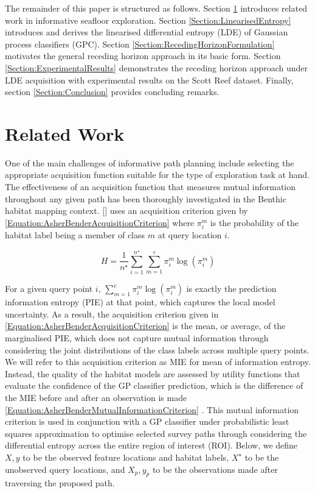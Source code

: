 \documentclass{article}
\newcommand{\incite}[1]{\citeauthor{#1} [\citeyear{#1}]}
\begin{document}
	The remainder of this paper is structured as follows. Section \ref{Section:RelatedWork} introduces related work in informative seafloor exploration. Section \ref{Section:LinearisedEntropy} introduces and derives the linearised differential entropy (LDE) of Gaussian process classifiers (GPC). Section \ref{Section:RecedingHorizonFormulation} motivates the general receding horizon approach in its basic form. Section \ref{Section:ExperimentalResults} demonstrates the receding horizon approach under LDE acquisition with experimental results on the Scott Reef dataset. Finally, section \ref{Section:Conclusion} provides concluding remarks.
	
\section{Related Work}
\label{Section:RelatedWork}

	One of the main challenges of informative path planning include selecting the appropriate acquisition function suitable for the type of exploration task at hand. The effectiveness of an acquisition function that measures mutual information throughout any given path has been thoroughly investigated in the Benthic habitat mapping context. \incite{AsherBender} uses an acquisition criterion given by \eqref{Equation:AsherBenderAcquisitionCriterion} where $\pi^{m}_{i}$ is the probability of the habitat label being a member of class $m$ at query location $i$. 
	
	\begin{equation}
		H = \frac{1}{n^{\star}} \sum_{i = 1}^{n^{\star}} \sum_{m = 1}^{c} \pi^{m}_{i} \log(\pi^{m}_{i})
	\label{Equation:AsherBenderAcquisitionCriterion}
	\end{equation}
	
	For a given query point $i$, $\sum_{m = 1}^{c} \pi^{m}_{i} \log(\pi^{m}_{i})$ is exactly the prediction information entropy (PIE) at that point, which captures the local model uncertainty. As a result, the acquisition criterion given in \eqref{Equation:AsherBenderAcquisitionCriterion} is the mean, or average, of the marginalised PIE, which does not capture mutual information through considering the joint distributions of the class labels across multiple query points. We will refer to this acquisition criterion as MIE for mean of information entropy. Instead, the quality of the habitat models are assessed by utility functions that evaluate the confidence of the GP classifier prediction, which is the difference of the MIE before and after an observation is made \eqref{Equation:AsherBenderMutualInformationCriterion} \cite{Rigby:ROB20372}. This mutual information criterion is used in conjunction with a GP classifier under probabilistic least squares approximation to optimise selected survey paths through considering the differential entropy across the entire region of interest (ROI). Below, we define $X, y$ to be the observed feature locations and habitat labels, $X^{\star}$ to be the unobserved query locations, and $X_{p}, y_{p}$ to be the observations made after traversing the proposed path.
\end{document}
